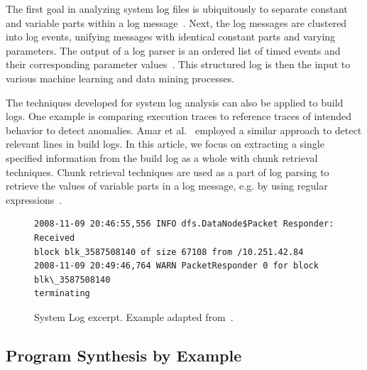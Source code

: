 The first goal in analyzing system log files is ubiquitously to
separate constant and variable parts within a log
message~\cite{nagappan2010abstracting,he2017towards}.
Next, the log
messages are clustered into log events, unifying messages with
identical constant parts and varying parameters.
The output of a log
parser is an ordered list of timed events and their corresponding
parameter values~\cite{he2016evaluation}.
This structured log is then
the input to various machine learning and data mining processes.

The techniques developed for system log analysis can also be applied
to build logs.
One example is comparing execution traces to reference
traces of intended behavior to detect anomalies.
Amar et
al.~\cite{amar2019mining} employed a similar approach to detect
relevant lines in build logs.
In this article, we focus on extracting a single specified information
from the build log as a whole with chunk retrieval techniques.
Chunk
retrieval techniques are used as a part of log parsing to retrieve the
values of variable parts in a log message, e.g.
by using regular
expressions~\cite{nagappan2010abstracting,xu2009detecting}.

\begin{figure}[!t]
  \centering
  \begin{lstlisting}[breaklines=true]
2008-11-09 20:46:55,556 INFO dfs.DataNode$Packet Responder: Received
block blk_3587508140 of size 67108 from /10.251.42.84
2008-11-09 20:49:46,764 WARN PacketResponder 0 for block blk\_3587508140
terminating
  \end{lstlisting}
  \caption{System Log excerpt.
Example adapted from~\cite{he2017towards}.}
  \label{lst:system-log}
\end{figure}

\subsection{Program Synthesis by Example}
\label{sec:rw-prose}

